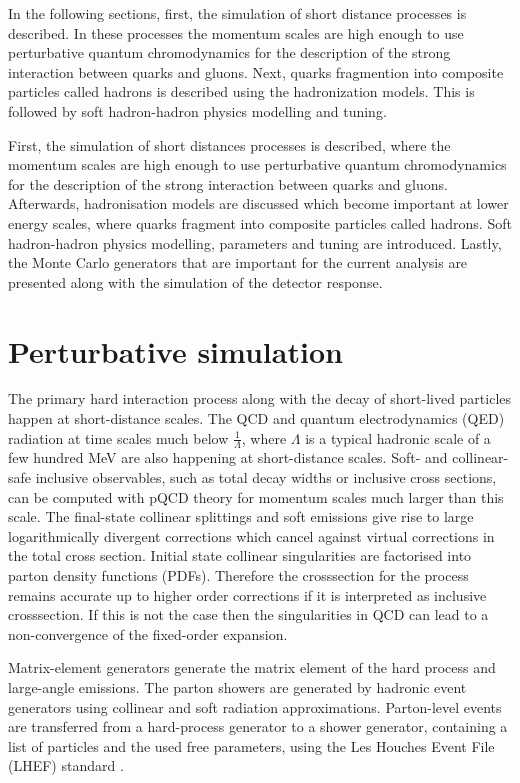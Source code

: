 In the following sections, first, the simulation of short distance processes is described. In these processes the momentum scales are high enough to use perturbative quantum chromodynamics for the description of the strong interaction between quarks and gluons. Next, quarks fragmention into composite particles called hadrons is described using the hadronization models. This is followed by soft hadron-hadron physics modelling and tuning.

First, the simulation of short distances processes is described, where the momentum scales are high enough to use perturbative quantum chromodynamics for the description of the strong interaction between quarks and gluons. Afterwards, hadronisation models are discussed which become important at lower energy scales, where quarks fragment into composite particles called hadrons. Soft hadron-hadron physics modelling, parameters and tuning are introduced. Lastly, the Monte Carlo generators that are important for the current analysis are presented along with the simulation of the detector response.


\section{Perturbative simulation}

The primary hard interaction process along with the decay of short-lived particles happen at short-distance scales. The QCD and quantum electrodynamics (QED) radiation at time scales much below $\frac{1}{\Lambda}$, where $\Lambda$ is a typical hadronic scale of a few hundred MeV are also happening at short-distance scales. Soft- and collinear-safe inclusive observables, such as total decay widths or inclusive cross sections, can be computed with pQCD theory for momentum scales much larger than this scale. The final-state collinear splittings and soft emissions give rise to large logarithmically divergent corrections which cancel against virtual corrections in the total cross section. Initial state collinear singularities are factorised into parton density functions (PDFs). Therefore the crosssection for the process remains accurate up to higher order corrections if it is interpreted as inclusive crosssection. If this is not the case then the singularities in QCD can lead to a non-convergence of the fixed-order expansion.

Matrix-element generators generate the matrix element of the hard process and large-angle emissions. The parton showers are generated by hadronic event generators using collinear and soft radiation approximations. Parton-level events are transferred from a hard-process generator to a shower generator, containing a list of particles and the used free parameters, using the Les Houches Event File (LHEF) standard \cite{Alwall:2006yp}.

